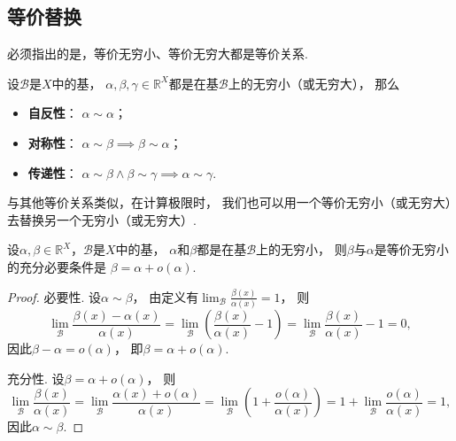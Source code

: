 \subsection{等价替换}
必须指出的是，等价无穷小、等价无穷大都是等价关系.
\begin{property}
设\(\mathcal{B}\)是\(X\)中的基，
\(\alpha,\beta,\gamma\in\mathbb{R}^X\)都是在基\(\mathcal{B}\)上的无穷小（或无穷大），
那么\begin{itemize}
	\item {\bf 自反性}：
	\(\alpha \sim \alpha\)；

	\item {\bf 对称性}：
	\(\alpha \sim \beta \implies \beta \sim \alpha\)；

	\item {\bf 传递性}：
	\(\alpha \sim \beta \land \beta \sim \gamma \implies \alpha \sim \gamma\).
\end{itemize}
\end{property}

与其他等价关系类似，在计算极限时，
我们也可以用一个等价无穷小（或无穷大）去替换另一个无穷小（或无穷大）.

\begin{theorem}\label{theorem:极限.无穷小的比较1}
设\(\alpha,\beta\in\mathbb{R}^X\)，\(\mathcal{B}\)是\(X\)中的基，
\(\alpha\)和\(\beta\)都是在基\(\mathcal{B}\)上的无穷小，
则\(\beta\)与\(\alpha\)是等价无穷小的充分必要条件是
\(\beta = \alpha + o(\alpha)\).
\begin{proof}
必要性.
设\(\alpha\sim\beta\)，
由定义有\(\lim_\mathcal{B} \frac{\beta(x)}{\alpha(x)} = 1\)，
则\[
	\lim_\mathcal{B} \frac{\beta(x)-\alpha(x)}{\alpha(x)}
	= \lim_\mathcal{B} \left(\frac{\beta(x)}{\alpha(x)}-1\right)
	= \lim_\mathcal{B} \frac{\beta(x)}{\alpha(x)}-1 = 0,
\]
因此\(\beta-\alpha=o(\alpha)\)，
即\(\beta=\alpha+o(\alpha)\).

充分性.
设\(\beta=\alpha+o(\alpha)\)，
则\[
	\lim_\mathcal{B} \frac{\beta(x)}{\alpha(x)}
	= \lim_\mathcal{B} \frac{\alpha(x)+o(\alpha)}{\alpha(x)}
	= \lim_\mathcal{B} \left(1+\frac{o(\alpha)}{\alpha(x)}\right)
	= 1 + \lim_\mathcal{B} \frac{o(\alpha)}{\alpha(x)}
	= 1,
\]
因此\(\alpha\sim\beta\).
\end{proof}
\end{theorem}

